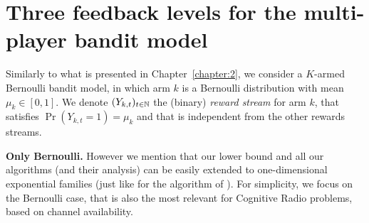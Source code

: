

\section{Three feedback levels for the multi-player bandit model}
\label{sec:5:model}

Similarly to what is presented in Chapter~\ref{chapter:2},
we consider a $K$-armed Bernoulli bandit model, %
in which arm $k$ is a Bernoulli distribution with mean $\mu_k\in[0,1]$.
We denote $(Y_{k,t})_{t\in\mathbb{N}}$ the \iid{} (binary) \emph{reward stream} for arm $k$, that satisfies $\Pr(Y_{k,t}=1) = \mu_k$ and that is independent from the other rewards streams.

\textbf{Only Bernoulli.}
However we mention that our lower bound and all our algorithms (and their analysis) can be easily extended to one-dimensional exponential families (just like for the \klUCB{} algorithm of \cite{KLUCBJournal}). For simplicity, we focus on the Bernoulli case, that is also the most relevant for Cognitive Radio problems, based on channel availability.





